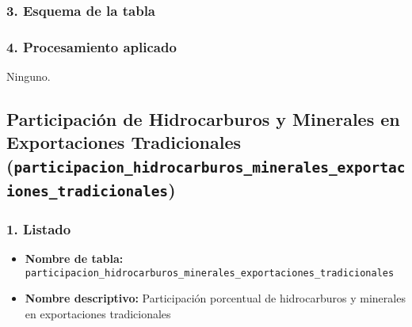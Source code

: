 \documentclass[12pt,a4paper]{article}
\begin{document}
\subsubsection*{3. Esquema de la tabla}

\subsubsection*{4. Procesamiento aplicado}
Ninguno.


\newpage
\subsection[Participación Hidrocarburos vs Minerales]{%
  Participación de Hidrocarburos y Minerales en Exportaciones Tradicionales\\
  {\small(\texttt{participacion\_hidrocarburos\_minerales\_exportaciones\_tradicionales})}%
}

\subsubsection*{1. Listado}
\begin{itemize}
  \item \textbf{Nombre de tabla:} \texttt{participacion\_hidrocarburos\_minerales\_exportaciones\_tradicionales}
  \item \textbf{Nombre descriptivo:} Participación porcentual de hidrocarburos y minerales en exportaciones tradicionales
\end{itemize}
\end{document}
